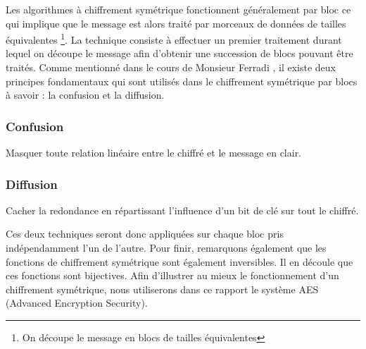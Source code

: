 \documentclass[letterpaper]{article}
\begin{document}
Les algorithmes à chiffrement symétrique fonctionnent généralement par bloc ce qui implique que le message est alors traité par morceaux de données de tailles équivalentes \footnote{On découpe le message en blocs de tailles équivalentes}. La technique consiste à effectuer un premier traitement durant lequel on découpe le message afin d'obtenir une succession de blocs pouvant être traités. Comme mentionné dans le cours de Monsieur Ferradi \cite{ref10}, il existe deux principes fondamentaux qui sont utilisés dans le chiffrement symétrique par blocs à savoir : la confusion et la diffusion.
\subsubsection{Confusion} Masquer toute relation linéaire entre le chiffré et le message en clair. \vspace{-0.2cm}
\subsubsection{Diffusion} Cacher la redondance en répartissant l'influence d'un bit de clé sur tout le chiffré. \vspace{0.3cm}

\noindent Ces deux techniques seront donc appliquées sur chaque bloc pris indépendamment l'un de l'autre. Pour finir, remarquons également que les fonctions de chiffrement symétrique sont également inversibles. Il en découle que ces fonctions sont bijectives. Afin d'illustrer au mieux le fonctionnement d'un chiffrement symétrique, nous utiliserons dans ce rapport le système AES (Advanced Encryption Security).
\end{document}
